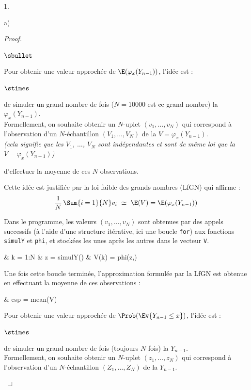 \begin{noliste}{1.}
\begin{noliste}{a)}
\begin{proof}
\begin{noliste}{$\sbullet$}
	
	\newpage
	
	
	\item Pour obtenir une valeur approchée de 
	$\E(\varphi_x(Y_{n-1}))$, l'idée est :
	\begin{noliste}{$\stimes$}
	  \item de simuler un grand nombre de fois ($N=10000$ est 
	  ce grand nombre) la \var $\varphi_x(Y_{n-1})$.\\
	  Formellement, on souhaite obtenir un $N$-uplet $(v_1, 
	  \ldots, v_N)$ qui correspond à l'observation d'un 
	  $N$-échantillon $(V_1, \ldots, V_N)$ de la \var $V= 
	  \varphi_x(Y_{n-1})$.\\
	  {\it (cela signifie que les \var $V_1$, $\ldots$, $V_N$
	  sont indépendantes et sont de même loi que
	  la \var $V= \varphi_x
	  (Y_{n-1})$)}
	  
	  \item d'effectuer la moyenne de ces $N$ observations.
	\end{noliste}
	Cette idée est justifiée par la loi faible des grands 
	nombres (LfGN) qui affirme : 
	\[
	  \dfrac{1}{N} \, \Sum{i=1}{N} v_i \ \simeq \ \E(V)  = 
	  \E(\varphi_x(Y_{n-1}))
	\]
	
	\item Dans le programme, les valeurs $(v_1, \ldots, v_N)$ 
	sont obtenues par des appels successifs (à l'aide d'une 
	structure itérative, ici une boucle {\tt for}) aux
	fonctions {\tt simulY} et {\tt phi}, et stockées les 
	unes après les autres dans le vecteur {\tt V}.
	\begin{scilabC}{4}
	  & \quad {} k = 1:N \nl %
	  & \quad \quad z = simulY() \nl %
	  & \quad \quad V(k) = phi(z,)
	\end{scilabC}
	Une fois cette boucle terminée, l'approximation formulée par 
	la LfGN est obtenue en effectuant la moyenne de ces 
	observations :
	\begin{scilabC}{13}
	  & \quad esp = mean(V)
	\end{scilabC}
	
	\item Pour obtenir une valeur approchée de $\Prob(\Ev{Y_{n-1}
	\leq x})$, l'idée est :
	\begin{noliste}{$\stimes$}
	  \item de simuler un grand nombre de fois (toujours $N$ fois)
	  la \var $Y_{n-1}$.\\
	  Formellement, on souhaite obtenir un $N$-uplet $(z_1, 
	  \ldots, z_N)$ qui correspond à l'observation d'un 
	  $N$-échantillon $(Z_1,\ldots, Z_N)$ de la \var $Y_{n-1}$.
	  

\end{noliste}
\end{noliste}
\end{proof}
\end{noliste}
\end{noliste}
